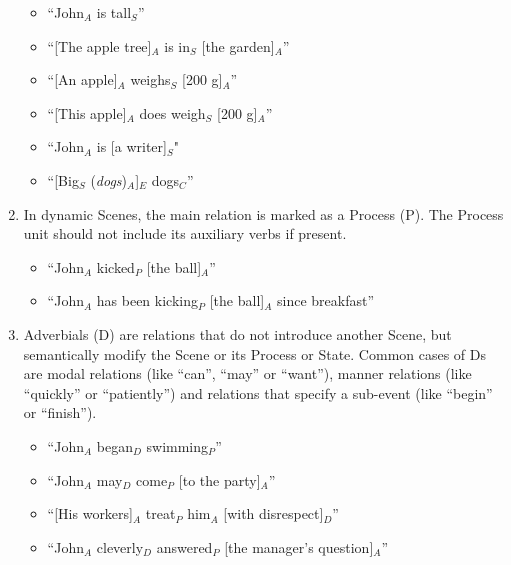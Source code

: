 \documentclass[11pt]{article}
\newcommand{\dcom}[1]{\textit{\color{blue}{#1}}}
\newcommand{\rem}[1]{{(\it #1})}
\begin{document}
\begin{enumerate}
    \begin{itemize}
    \item
      ``John$_A$ is tall$_S$''
    \item
      ``[The apple tree]$_A$ is in$_S$ [the garden]$_A$''
    \item
      ``[An apple]$_A$ weighs$_S$ [200 g]$_A$''
    \item
      ``[This apple]$_A$ does weigh$_S$ [200 g]$_A$''
    \item
      ``John$_A$ is [a writer]$_S$"
    \item
      ``[Big$_S$ \rem{dogs}$_A$]$_E$ dogs$_C$'' 
    \end{itemize}
    
    
  \item
    In dynamic Scenes, the main relation is marked as a {\sc Process} (P). The Process unit should not include its auxiliary verbs if present.
    
    \begin{itemize}
    \item
      ``John$_A$ kicked$_P$ [the ball]$_A$''
    \item
      ``John$_A$ has been kicking$_P$ [the ball]$_A$ since breakfast''
    \end{itemize}
    
  \item
    {\sc Adverbials} (D) are relations that do not introduce another Scene, but semantically modify the Scene or its {\sc Process} or {\sc State}. Common cases of Ds are modal relations (like ``can'', ``may'' or ``want''), manner relations (like ``quickly'' or ``patiently'') and relations that specify a sub-event (like ``begin'' or ``finish'').
    
    \begin{itemize}
    \item
      ``John$_A$ began$_D$ swimming$_P$''
    \item
      ``John$_A$ may$_D$ come$_P$ [to the party]$_A$''
    \item
      ``[His workers]$_A$ treat$_P$ him$_A$ [with disrespect]$_D$''
    \item
      ``John$_A$ cleverly$_D$ answered$_P$ [the manager's question]$_A$''
    \end{itemize}
    

\end{enumerate}
\end{document}
